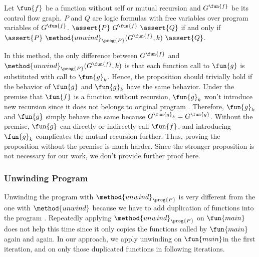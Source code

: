 \begin{proposition}\label{prop:unwinding-duplicate}
  Let $\fun{f}$ be a function without self or mutual recursion and 
  $G^\fun{f}$ be its control flow graph.
  $P$ and $Q$ are logic formulas with free variables over program variables of
  $G^\fun{f}$.
  $\assert{P}\ G^\fun{f}\ \assert{Q}$ if and only if 
  $\assert{P}\ \method{unwind}_\prog{P}(G^\fun{f}, k)\ \assert{Q}$.
\end{proposition}
In this method, the only difference between $G^\fun{f}$ and
$\method{unwind}_\prog{P}(G^\fun{f}, k)$ is that each function call to
$\fun{g}$ is substituted with call to $\fun{g}_k$.
Hence, the proposition should trivially hold if the behavior of $\fun{g}$ and
$\fun{g}_k$ have the same behavior.
Under the premise that $\fun{f}$ is a function without recursion,
$\fun{g}_k$ won't introduce new recursion since it does not belongs to original
program .
Therefore, $\fun{g}_k$ and $\fun{g}$ simply behave the same because 
$G^{\fun{g}_k} = G^\fun{g}$.
Without the premise, $\fun{g}$ can directly or indirectly call $\fun{f}$,
and introducing $\fun{g}_k$ complicates the mutual recursion further.
Thus, proving the proposition without the premise is much harder.
Since the stronger proposition is not necessary for our work,
we don't provide further proof here.

\subsubsection*{Unwinding Program}
Unwinding the program with $\method{unwind}_\prog{P}$ is very different from
the one with $\method{unwind}$ because we have to add duplication of functions
into the program .
Repeatedly applying $\method{unwind}_\prog{P}$ on $\fun{main}$ does not help
this time since it only copies the functions called by $\fun{main}$ again
and again.
In our approach, we apply unwinding on $\fun{main} $in the first iteration,
and on only those duplicated functions in following iterations.


